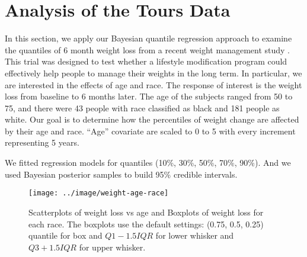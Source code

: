 \documentclass[12pt]{article}
\begin{document}
\section{Analysis of the Tours Data}
\label{sec:tours}
In this section, we apply our Bayesian quantile regression approach to
examine the quantiles of 6 month weight loss from a recent weight
management study \citep{perri2008extended}.  This trial was designed
to test whether a lifestyle modification program could effectively
help people to manage their weights in the long term.  In particular,
we are interested in the effects of age and race.  The response of
interest is the weight loss from baseline to 6 months later. The age
of the subjects ranged from 50 to 75, and there were 43 people with
race classified as black and 181 people as white.  Our goal is to
determine how the percentiles of weight change are affected by their
age and race.  ``Age'' covariate are scaled to 0 to 5 with every
increment representing 5 years.

We fitted regression models for quantiles (10\%, 30\%, 50\%, 70\%,
90\%). And we used Bayesian posterior samples to build 95\% credible
intervals.

\begin{figure}[htbp]
  \centerline{\texttt{[image: ../image/weight-age-race]}}
  \caption[]{\label{fig:tours} Scatterplots of weight loss vs age and
    Boxplots of weight loss for each race.  The boxplots use the
    default settings: (0.75, 0.5, 0.25) quantile for box and
    $Q1-1.5IQR$ for lower whisker and $Q3+1.5IQR$ for upper whisker. }
\end{figure}
\end{document}

